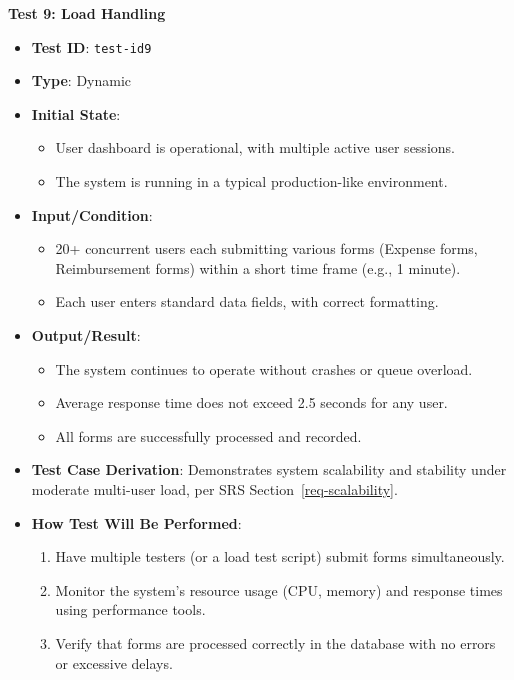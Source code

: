 \documentclass[12pt, titlepage]{article}
\begin{document}
\textbf{Test 9: Load Handling}
\begin{itemize}
    \item \textbf{Test ID}: \texttt{test-id9}
    \item \textbf{Type}: Dynamic
    \item \textbf{Initial State}:
    \begin{itemize}
        \item User dashboard is operational, with multiple active user sessions.
        \item The system is running in a typical production-like environment.
    \end{itemize}
    \item \textbf{Input/Condition}:
    \begin{itemize}
        \item 20+ concurrent users each submitting various forms (Expense forms, Reimbursement forms) within a short time frame (e.g., 1 minute).
        \item Each user enters standard data fields, with correct formatting.
    \end{itemize}
    \item \textbf{Output/Result}:
    \begin{itemize}
        \item The system continues to operate without crashes or queue overload.
        \item Average response time does not exceed 2.5 seconds for any user.
        \item All forms are successfully processed and recorded.
    \end{itemize}
    \item \textbf{Test Case Derivation}:
    Demonstrates system scalability and stability under moderate multi-user load, per SRS Section~\ref{req-scalability}.
    \item \textbf{How Test Will Be Performed}:
    \begin{enumerate}
        \item Have multiple testers (or a load test script) submit forms simultaneously.
        \item Monitor the system’s resource usage (CPU, memory) and response times using performance tools.
        \item Verify that forms are processed correctly in the database with no errors or excessive delays.
    \end{enumerate}
\end{itemize}
\end{document}
